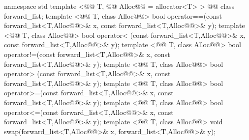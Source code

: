 \documentclass[american,twoside]{book}
\begin{document}
\begin{codeblock}
namespace std {
  template <@@ T, @@ Alloc@@ = allocator<T> > 
    @@
    class forward_list; 
  template <@@ T, class Alloc@@> 
    bool operator==(const forward_list<T,Alloc@@>& x, const forward_list<T,Alloc@@>& y); 
  template <@@ T, class Alloc@@> 
    bool operator< (const forward_list<T,Alloc@@>& x, const forward_list<T,Alloc@@>& y); 
  template <@@ T, class Alloc@@> 
    bool operator!=(const forward_list<T,Alloc@@>& x, const forward_list<T,Alloc@@>& y); 
  template <@@ T, class Alloc@@> 
    bool operator> (const forward_list<T,Alloc@@>& x, const forward_list<T,Alloc@@>& y); 
  template <@@ T, class Alloc@@> 
    bool operator>=(const forward_list<T,Alloc@@>& x, const forward_list<T,Alloc@@>& y); 
  template <@@ T, class Alloc@@> 
    bool operator<=(const forward_list<T,Alloc@@>& x, const forward_list<T,Alloc@@>& y); 
  template <@@ T, class Alloc@@> 
    void swap(forward_list<T,Alloc@@>& x, forward_list<T,Alloc@@>& y); 
}
\end{codeblock}

%
\end{document}
